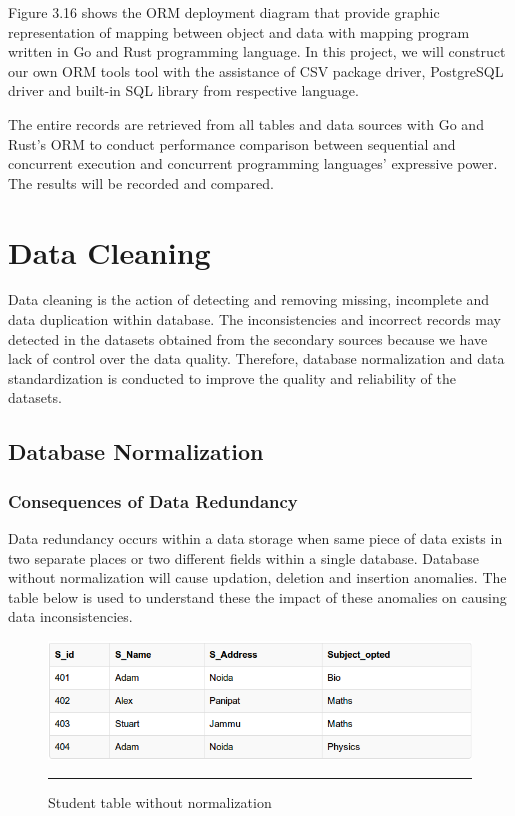 Figure 3.16 shows the ORM deployment diagram that provide graphic representation of mapping between object and data with mapping program written in Go and Rust programming language. In this project, we will construct our own ORM tools tool with the assistance of CSV package driver, PostgreSQL driver and built-in SQL library from respective language. 

The entire records are retrieved from all tables and data sources with Go and Rust's ORM to conduct performance comparison between sequential and concurrent execution and concurrent programming languages' expressive power. The results will be recorded and compared. 

\section{Data Cleaning}

Data cleaning is the action of detecting and removing missing, incomplete and data duplication within database. \cite{data-cleaning-definition} The inconsistencies and incorrect records may detected in the datasets obtained from the secondary sources because we have lack of control over the data quality. Therefore, database normalization and data standardization is conducted to improve the quality and reliability of the datasets. 

\subsection{Database Normalization}

\subsubsection{Consequences of Data Redundancy}

Data redundancy occurs within a data storage when same piece of data exists in two separate places or two different fields within a single database. Database without normalization will cause updation, deletion and insertion anomalies. The table below is used to understand these the impact of these anomalies on causing data inconsistencies. 

\begin{figure}[H]
	\centering
	\includegraphics[width=1.0\textwidth]{FYP2/Chapter3/denormalization-example.png}
	\rule{35em}{0.5pt}
	\caption[Student table without normalization]{Student table without normalization}
\end{figure}

